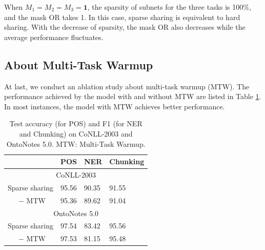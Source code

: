 \documentclass[letterpaper]{article} %
\begin{document}
When $M_1=M_2=M_3=\mathbf{1}$, the sparsity of subnets for the three tasks is 100\%, and the mask OR takes 1. In this case, sparse sharing is equivalent to hard sharing. With the decrease of sparsity, the mask OR also decreases while the average performance fluctuates.

\subsection{About Multi-Task Warmup}
At last, we conduct an ablation study about multi-task warmup (MTW). The performance achieved by the model with and without MTW are listed in Table \ref{tb:warmup}. In most instances, the model with MTW achieves better performance.

\begin{table}[htb]
\centering
\begin{tabular}{llll}
\toprule
& POS & NER & Chunking \\ \midrule
\multicolumn{4}{c}{CoNLL-2003} \\ \midrule
Sparse sharing & 95.56 & 90.35 & 91.55 \\
\ \ \ $-$ MTW & 95.36 & 89.62 & 91.04 \\ \midrule
\multicolumn{4}{c}{OntoNotes 5.0} \\ \midrule
Sparse sharing & 97.54 & 83.42 & 95.56 \\
\ \ \ $-$ MTW & 97.53 & 81.15 & 95.48 \\ \bottomrule
\end{tabular}
\caption{Test accuracy (for POS) and F1 (for NER and Chunking) on CoNLL-2003 and OntoNotes 5.0. MTW: Multi-Task Warmup.}
\label{tb:warmup}
\end{table}
\end{document}
